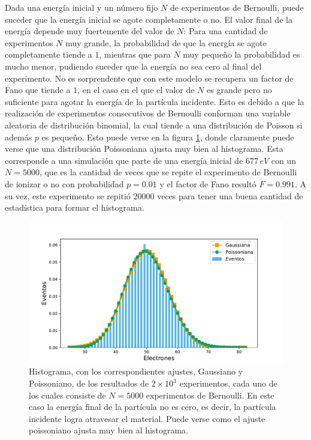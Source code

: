 Dada una energía inicial y un número fijo $N$ de experimentos de Bernoulli, puede suceder que la energía inicial se agote completamente o no. El valor final de la energía depende muy fuertemente del valor de $N$: Para una cantidad de experimentos $N$ muy grande, la probabilidad de que la energía se agote completamente tiende a $1$, mientras que para $N$ muy pequeño la probabilidad es mucho menor, pudiendo suceder que la energía no sea cero al final del experimento. No es sorprendente que con este modelo se recupera un factor de Fano que tiende a $1$, en el caso en el que el valor de $N$ es grande pero no suficiente para agotar la energía de la partícula incidente. Esto es debido a que la realización de experimentos consecutivos de Bernoulli conforman una variable aleatoria de distribución binomial, la cual tiende a una distribución de Poisson si además $p$ es pequeño. Esto puede verse en la figura \ref{fig:SimulacionOrden0Fano1}, donde claramente puede verse que una distribución Poissoniana ajusta muy bien al histograma. Esta corresponde a una simulación que parte de una energía inicial de $677\,\si{eV}$ con un $N = 5000$, que es la cantidad de veces que se repite el experimento de Bernoulli de ionizar o no con probabilidad $p=0.01$ y el factor de Fano resultó $F = 0.991$. A su vez, este experimento se repitió $20000$ veces para tener una buena cantidad de estadística para formar el histograma.
\begin{figure}%
    \centering
    \includegraphics[scale=0.5]{Figs/Orden0_fano1.pdf}
    \caption{\footnotesize{Histograma, con los correspondientes ajustes, Gaussiano y Poissoniano, de los resultados de $2\times 10^3$ experimentos, cada uno de los cuales consiste de $N = 5000$ experimentos de Bernoulli. En este caso la energía final de la partícula no es cero, es decir, la partícula incidente logra atravesar el material. Puede verse como el ajuste poissoniano ajusta muy bien al histograma.}}
    \label{fig:SimulacionOrden0Fano1}
\end{figure}
